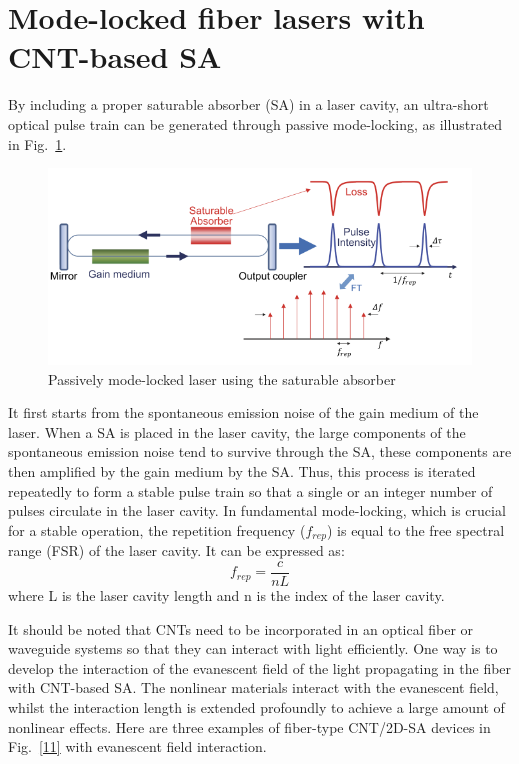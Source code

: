 \documentclass{phyasgn}\usepackage{nag}
\newcommand{\figref}[1]{Fig.~\ref{#1}}
\begin{document}
\section{Mode-locked fiber lasers with CNT-based SA}
By including a proper saturable absorber (SA) in a laser cavity, an ultra-short optical pulse train can be generated through passive mode-locking\cite{keller2003recent}, as illustrated in \figref{10}. 
\begin{figure}[!h]
	\centering
	\includegraphics[width=.9\linewidth]{pic/10.png}
	\caption[Band structures]{Passively mode-locked laser using the saturable
    absorber\cite{keller2003recent}}
	\label{10}
	\end{figure}
\par It first starts from the spontaneous emission noise of the gain medium of the laser. When a SA is placed in the laser cavity, the large components of the spontaneous emission noise tend to survive through the SA, these components are then amplified by the gain medium by the SA. Thus, this process is iterated repeatedly to form a stable pulse train so that a single or an integer number of pulses circulate in the laser cavity. In fundamental mode-locking, which is crucial for a stable operation, the repetition frequency ($f_{rep}$) is equal to the free spectral range (FSR) of the laser cavity. It can be expressed as:
\begin{equation}
f_{rep}=\dfrac{c}{nL}
\end{equation}
where L is the laser cavity length and n is the index of the laser cavity. 
\par It should be noted that CNTs need to be incorporated in an optical fiber or waveguide systems so that they can interact with light efficiently. One way is to develop the interaction of the evanescent field of the light propagating in the fiber with CNT-based SA. The nonlinear materials interact with the evanescent field, whilst the interaction length is extended profoundly to achieve a large amount of nonlinear effects. Here are three examples of fiber-type CNT/2D-SA devices in \figref{11} with evanescent field interaction.
\end{document}
